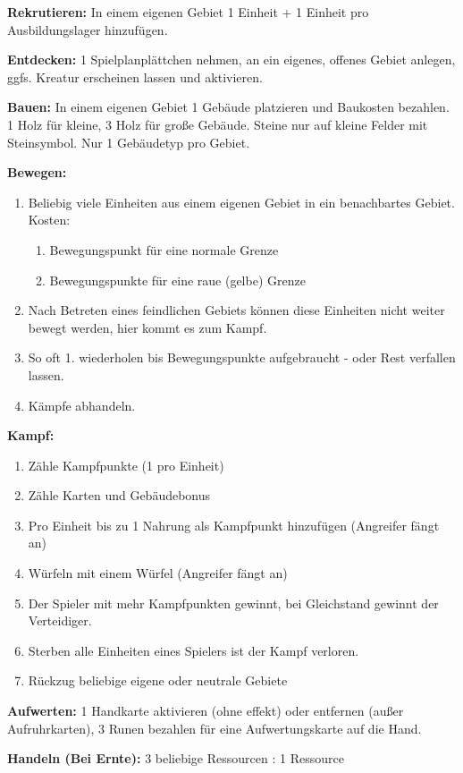 \documentclass[fontsize=6pt]{scrreprt}
\begin{document}
  \textbf{Rekrutieren:}
  In einem eigenen Gebiet 1 Einheit + 1 Einheit pro Ausbildungslager hinzufügen.

  \textbf{Entdecken:}
  1 Spielplanplättchen nehmen, an ein eigenes, offenes Gebiet anlegen,
  ggfs. Kreatur erscheinen lassen und aktivieren.

  \textbf{Bauen:}
  In einem eigenen Gebiet 1 Gebäude platzieren und Baukosten bezahlen.
  1 Holz für kleine, 3 Holz für große Gebäude.
  Steine nur auf kleine Felder mit Steinsymbol.
  Nur 1 Gebäudetyp pro Gebiet.

  \textbf{Bewegen:}
  \begin{enumerate}[topsep=1pt, partopsep=0pt, parsep=0pt, itemsep=0pt, leftmargin=12pt]
    \item Beliebig viele Einheiten aus einem eigenen Gebiet in ein benachbartes Gebiet. Kosten:
    \begin{enumerate}[label=\textbf{\arabic*x}, topsep=0pt, partopsep=0pt, parsep=0pt, itemsep=0pt, leftmargin=10pt]
      \item Bewegungspunkt für eine normale Grenze
      \item Bewegungspunkte für eine raue (gelbe) Grenze
    \end{enumerate}
    \item Nach Betreten eines feindlichen Gebiets können diese Einheiten nicht weiter bewegt werden, hier kommt es zum Kampf.
    \item So oft 1. wiederholen bis Bewegungspunkte aufgebraucht - oder Rest verfallen lassen.
    \item Kämpfe abhandeln.
  \end{enumerate}

  \textbf{Kampf:}
  \begin{enumerate}[topsep=1pt, partopsep=0pt, parsep=0pt, itemsep=0pt, leftmargin=12pt]
    \item Zähle Kampfpunkte (1 pro Einheit)
    \item Zähle Karten und Gebäudebonus
    \item Pro Einheit bis zu 1 Nahrung als Kampfpunkt hinzufügen (Angreifer fängt an)
    \item Würfeln mit einem Würfel (Angreifer fängt an)
    \item Der Spieler mit mehr Kampfpunkten gewinnt, bei Gleichstand gewinnt der Verteidiger.
    \item Sterben alle Einheiten eines Spielers ist der Kampf verloren.
    \item Rückzug beliebige eigene oder neutrale Gebiete
  \end{enumerate}

  \textbf{Aufwerten:} 1 Handkarte aktivieren (ohne effekt) oder entfernen (außer Aufruhrkarten), 3 Runen bezahlen für eine Aufwertungskarte auf die Hand.

  \textbf{Handeln (Bei Ernte):} 3 beliebige Ressourcen : 1 Ressource
\end{document}
